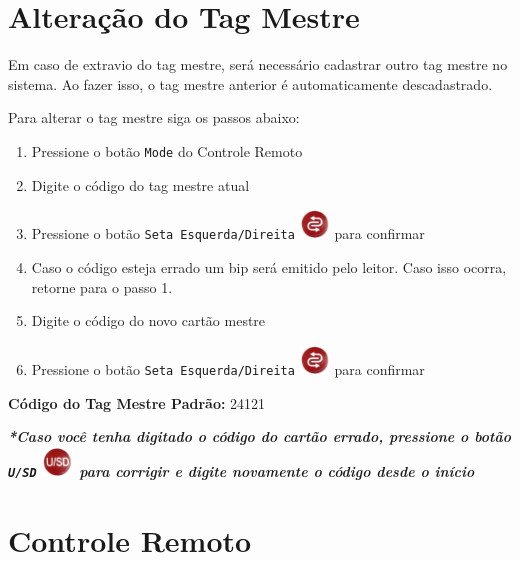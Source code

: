 \documentclass[a4paper, 12pt]{article}
\begin{document}
\newpage
\section{Alteração do Tag Mestre}

Em caso de extravio do tag mestre, será necessário cadastrar outro tag mestre no sistema. Ao fazer isso, o tag mestre anterior é automaticamente descadastrado.\par
Para alterar o tag mestre siga os passos abaixo:

\begin{enumerate}
\item Pressione o botão \texttt{Mode} do Controle Remoto
\item Digite o código do tag mestre atual
\item Pressione o botão \texttt{Seta Esquerda/Direita} \includegraphics[height=8mm]{ok} para confirmar
\item Caso o código esteja errado um bip será emitido pelo leitor. Caso isso ocorra, retorne para o passo 1.
\item Digite o código do novo cartão mestre
\item Pressione o botão \texttt{Seta Esquerda/Direita} \includegraphics[height=8mm]{ok} para confirmar
\end{enumerate}

\textbf{Código do Tag Mestre Padrão:} 24121\\\par

\textbf{\textit{*Caso você tenha digitado o código do cartão errado, pressione o botão \texttt{U/SD} \includegraphics[height=8mm]{cancel} para corrigir e digite novamente o código desde o início}}

\section{Controle Remoto}
\end{document}
